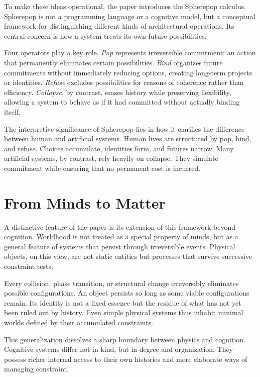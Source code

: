 \documentclass[11pt]{article}
\begin{document}
To make these ideas operational, the paper introduces the Spherepop calculus. Spherepop is not a programming language or a cognitive model, but a conceptual framework for distinguishing different kinds of architectural operations. Its central concern is how a system treats its own future possibilities.

Four operators play a key role. \textit{Pop} represents irreversible commitment: an action that permanently eliminates certain possibilities. \textit{Bind} organizes future commitments without immediately reducing options, creating long-term projects or identities. \textit{Refuse} excludes possibilities for reasons of coherence rather than efficiency. \textit{Collapse}, by contrast, erases history while preserving flexibility, allowing a system to behave as if it had committed without actually binding itself.

The interpretive significance of Spherepop lies in how it clarifies the difference between human and artificial systems. Human lives are structured by pop, bind, and refuse. Choices accumulate, identities form, and futures narrow. Many artificial systems, by contrast, rely heavily on collapse. They simulate commitment while ensuring that no permanent cost is incurred.

\section{From Minds to Matter}

A distinctive feature of the paper is its extension of this framework beyond cognition. Worldhood is not treated as a special property of minds, but as a general feature of systems that persist through irreversible events. Physical objects, on this view, are not static entities but processes that survive successive constraint tests.

Every collision, phase transition, or structural change irreversibly eliminates possible configurations. An object persists so long as some viable configurations remain. Its identity is not a fixed essence but the residue of what has not yet been ruled out by history. Even simple physical systems thus inhabit minimal worlds defined by their accumulated constraints.

This generalization dissolves a sharp boundary between physics and cognition. Cognitive systems differ not in kind, but in degree and organization. They possess richer internal access to their own histories and more elaborate ways of managing constraint.
\end{document}
